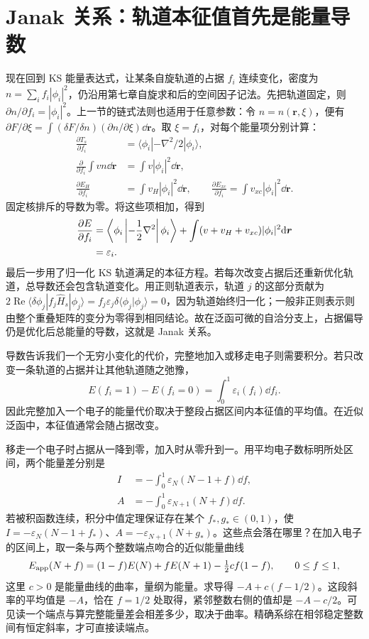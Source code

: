 \section{Janak 关系：轨道本征值首先是能量导数}\label{spectra:janak-section}
现在回到 KS 能量表达式，让某条自旋轨道的占据 $f_i$ 连续变化，密度为 $n=\sum_i f_i|\phi_i|^2$，仍沿用第七章自旋求和后的空间因子记法。先把轨道固定，则 $\partial n/\partial f_i=|\phi_i|^2$。上一节的链式法则也适用于任意参数：令 $n=n(\bm r,\xi)$，便有 $\partial F/\partial\xi=\int(\delta F/\delta n)(\partial n/\partial\xi)\dd\bm r$。取 $\xi=f_i$，对每个能量项分别计算：
\begin{align}
\frac{\partial T_s}{\partial f_i}&=\langle\phi_i|-\nabla^2/2|\phi_i\rangle,\\
\frac{\partial}{\partial f_i}\int vn\dd\bm r&=\int v|\phi_i|^2\dd\bm r,\\
\frac{\partial E_H}{\partial f_i}&=\int v_H|\phi_i|^2\dd\bm r,\qquad
\frac{\partial E_{xc}}{\partial f_i}=\int v_{xc}|\phi_i|^2\dd\bm r.
\end{align}
固定核排斥的导数为零。将这些项相加，得到
\begin{align}
\frac{\partial E}{\partial f_i}
&=\left\langle\phi_i\left|-\frac12\nabla^2\right|\phi_i\right\rangle
+\int(v+v_H+v_{xc})|\phi_i|^2\mathrm{d}\bm r\notag\\
&=\varepsilon_i.
\end{align}
最后一步用了归一化 KS 轨道满足的本征方程。若每次改变占据后还重新优化轨道，总导数还会包含轨道变化。用正则轨道表示，轨道 $j$ 的这部分贡献为 $2\operatorname{Re}\langle\delta\phi_j|f_j\hat H_s|\phi_j\rangle=f_j\varepsilon_j\delta\langle\phi_j|\phi_j\rangle=0$，因为轨道始终归一化；一般非正则表示则由整个重叠矩阵的变分为零得到相同结论。故在泛函可微的自洽分支上，占据偏导仍是优化后总能量的导数，这就是 Janak 关系。

导数告诉我们一个无穷小变化的代价，完整地加入或移走电子则需要积分。若只改变一条轨道的占据并让其他轨道随之弛豫，
\begin{equation}
E(f_i=1)-E(f_i=0)=\int_0^1\varepsilon_i(f_i)\dd f_i.
\end{equation}
因此完整加入一个电子的能量代价取决于整段占据区间内本征值的平均值。在近似泛函中，本征值通常会随占据改变。

移走一个电子时占据从一降到零，加入时从零升到一。用平均电子数标明所处区间，两个能量差分别是
\begin{align}\label{spectra:occupation-integrals}
I&=-\int_0^1\varepsilon_N(N-1+f)\dd f,\\
A&=-\int_0^1\varepsilon_{N+1}(N+f)\dd f.
\end{align}
若被积函数连续，积分中值定理保证存在某个 $f_*,g_*\in(0,1)$，使 $I=-\varepsilon_N(N-1+f_*)$、$A=-\varepsilon_{N+1}(N+g_*)$。这些点会落在哪里？在加入电子的区间上，取一条与两个整数端点吻合的近似能量曲线
\[
 E_{\rm app}(N+f)=(1-f)E(N)+f E(N+1)-\tfrac12 c f(1-f),
 \qquad 0\le f\le1 ,
\]
这里 $c>0$ 是能量曲线的曲率，量纲为能量。求导得 $-A+c(f-1/2)$。这段斜率的平均值是 $-A$，恰在 $f=1/2$ 处取得，紧邻整数右侧的值却是 $-A-c/2$。可见读一个端点与算完整能量差会相差多少，取决于曲率。精确系综在相邻稳定整数间有恒定斜率，才可直接读端点。


